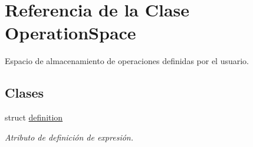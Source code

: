 \hypertarget{class_operation_space}{}\section{Referencia de la Clase Operation\+Space}
\label{class_operation_space}


Espacio de almacenamiento de operaciones definidas por el usuario.  


\subsection*{Clases}
\begin{DoxyCompactItemize}
\item 
struct \hyperlink{struct_operation_space_1_1definition}{definition}
\begin{DoxyCompactList}\small\item\em Atributo de definición de expresión. \end{DoxyCompactList}\end{DoxyCompactItemize}
